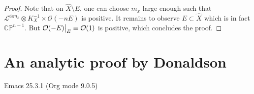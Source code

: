 \documentclass[11pt]{article}
\newcommand\restr[2]{{%
\left.\kern-\nulldelimiterspace %
#1 %
\vphantom{\big|} %
\right|_{#2} %
}}
\begin{document}
\begin{proof}
Note that on \(\hat X \setminus E\), one can choose \(m_x\) large enough such that \(\mathcal{L}^{\otimes m_x}\otimes K_X^{-1}\times \mathcal{O}(-nE)\) is positive. It
remains to observe \(E\subset \hat X\) which is in fact \(\mathbb{CP}^{n-1}\). But \(\restr{\mathcal{O}(-E)}{E} \equiv \mathcal{O}(1)\) is positive, which concludes the proof.
\end{proof}


\section{An analytic proof by Donaldson}
\label{sec:org6ac4566}
Emacs 25.3.1 (Org mode 9.0.5)
\end{document}
